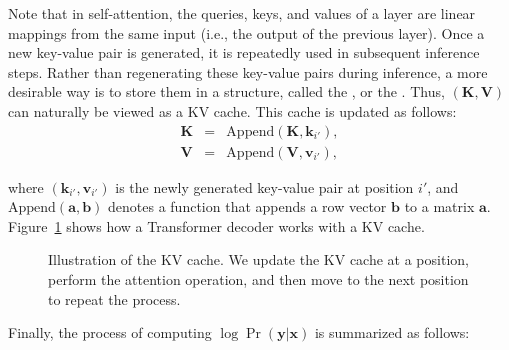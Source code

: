 Note that in self-attention, the queries, keys, and values of a layer are linear mappings from the same input (i.e., the output of the previous layer). Once a new key-value pair is generated, it is repeatedly used in subsequent inference steps. Rather than regenerating these key-value pairs during inference, a more desirable way is to store them in a structure, called the , or the . Thus, $(\mathbf{K},\mathbf{V})$ can naturally be viewed as a KV cache. This cache is updated as follows:
\begin{eqnarray}
\mathbf{K} & = & \mathrm{Append}(\mathbf{K}, \mathbf{k}_{i'}), \label{eq:kv-cache-update-k} \\
\mathbf{V} & = & \mathrm{Append}(\mathbf{V}, \mathbf{v}_{i'}), \label{eq:kv-cache-update-v}
\end{eqnarray}

\noindent where $(\mathbf{k}_{i'}, \mathbf{v}_{i'})$ is the newly generated key-value pair at position $i'$, and $\mathrm{Append}(\mathbf{a},\mathbf{b})$ denotes a function that appends a row vector $\mathbf{b}$ to a matrix $\mathbf{a}$. Figure~\ref{fig:kv-cache-llm} shows how a Transformer decoder works with a KV cache.

\begin{figure}[!t]
\centering

\caption{Illustration of the KV cache. We update the KV cache at a position, perform the attention operation, and then move to the next position to repeat the process.}
\label{fig:kv-cache-llm}
\end{figure}

Finally, the process of computing $\log \Pr(\mathbf{y}|\mathbf{x})$ is summarized as follows:


